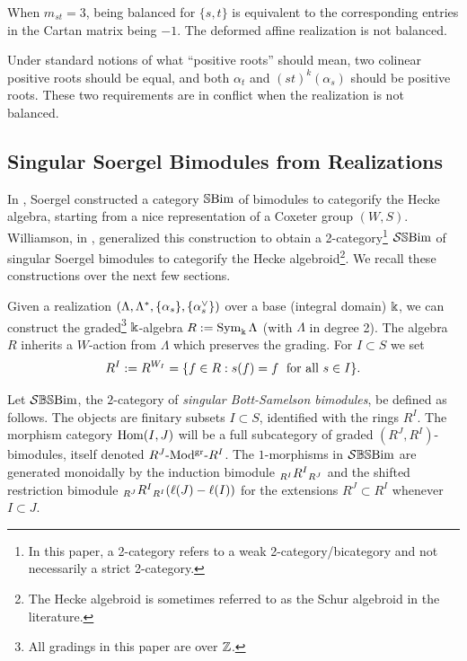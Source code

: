 When $m_{st} = 3$, being balanced for $\{s,t\}$ is equivalent to the corresponding entries in the Cartan matrix being $-1$. The deformed affine realization is not balanced.

Under standard notions of what ``positive roots'' should mean, two colinear positive roots should be equal, and both $\alpha_t$ and $(st)^k(\alpha_s)$ should be positive roots. These two requirements are in conflict when the realization is not balanced.

\subsection{Singular Soergel Bimodules from Realizations}
\label{subsec- SSBim}
In \cite{Soer07}, Soergel constructed a category $\SBim$ of bimodules to categorify the Hecke algebra, starting from a nice representation of a Coxeter group $(W,S)$. Williamson, in \cite{WillSingular}, generalized this construction to obtain a 2-category\footnote{In this paper, a 2-category refers to a weak 2-category/bicategory and not necessarily a strict 2-category.} $\SSBim$ of singular Soergel bimodules to categorify the Hecke algebroid\footnote{The Hecke algebroid is sometimes referred to as the Schur algebroid in the literature.}.  We recall these constructions over the next few sections.


Given a realization $(\Lambda,\Lambda^*,\{\al_s\},\{\al_s^\vee\})$ over a base (integral domain) $\kk$, we can construct the graded\footnote{All gradings in this paper are over $\Z$.} $\kk$-algebra $R:= \Sym_\kk \Lambda$ (with $\Lambda$ in degree 2). 
The algebra $R$ inherits a $W$-action from $\Lambda$ which preserves the grading. 
For $I\subset S$ we set 
\[ R^I:=R^{W_I}=\{ f \in R: s(f)=f \text{\; for all }s \in I \}.\]

\begin{defn}\label{def sbsbim}
Let $\SBSBim$, the $2$-category of \emph{singular Bott-Samelson bimodules}, be defined as follows. The objects are finitary subsets $I \subset S$, identified with the rings $R^I$. The morphism category $\Hom(I,J)$ will be a full subcategory of graded $(R^J,R^I)$-bimodules, itself denoted $\bModgr{R^J}{R^I}$. The $1$-morphisms in $\SBSBim$ are generated monoidally by the induction bimodule
$\Bimod{R^I}{R^J}{R^I}$ and the shifted restriction bimodule $\Bimod{R^J}{R^I}{R^I} (\ell(J)-\ell(I))$ for the extensions $R^J \subset R^I$ whenever $I \subset J$. \end{defn}

